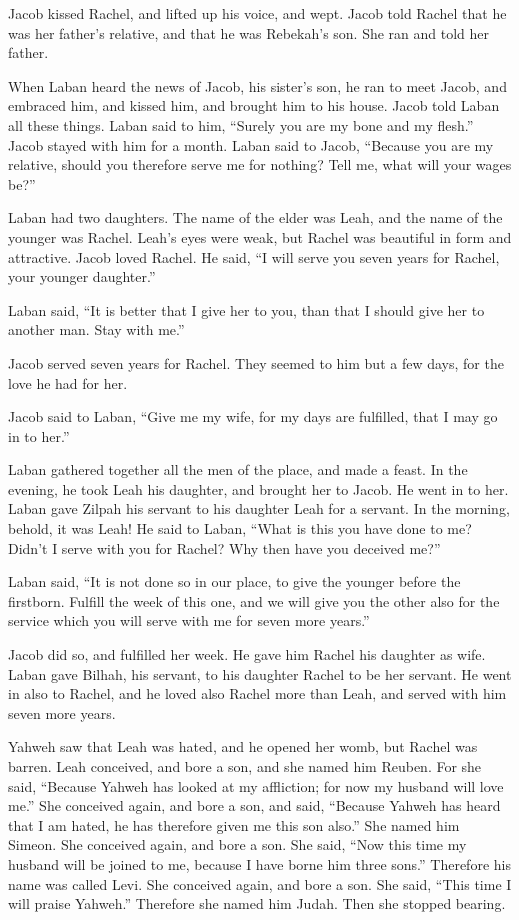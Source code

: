 {Jacob kissed Rachel, and lifted up his voice, and wept.
Jacob told Rachel that he was her father’s relative, and that he was Rebekah’s son. She ran and told her father.
\par }{\PP {}When Laban heard the news of Jacob, his sister’s son, he ran to meet Jacob, and embraced him, and kissed him, and brought him to his house. Jacob told Laban all these things.
Laban said to him, “Surely you are my bone and my flesh.” Jacob stayed with him for a month.
Laban said to Jacob, “Because you are my relative, should you therefore serve me for nothing? Tell me, what will your wages be?”
\par }{\PP {}Laban had two daughters. The name of the elder was Leah, and the name of the younger was Rachel.
Leah’s eyes were weak, but Rachel was beautiful in form and attractive.
Jacob loved Rachel. He said, “I will serve you seven years for Rachel, your younger daughter.”
\par }{\PP {}Laban said, “It is better that I give her to you, than that I should give her to another man. Stay with me.”
\par }{\PP {}Jacob served seven years for Rachel. They seemed to him but a few days, for the love he had for her.
\par }{\PP {}Jacob said to Laban, “Give me my wife, for my days are fulfilled, that I may go in to her.”
\par }{\PP {}Laban gathered together all the men of the place, and made a feast.
In the evening, he took Leah his daughter, and brought her to Jacob. He went in to her.
Laban gave Zilpah his servant to his daughter Leah for a servant.
In the morning, behold, it was Leah! He said to Laban, “What is this you have done to me? Didn’t I serve with you for Rachel? Why then have you deceived me?”
\par }{\PP {}Laban said, “It is not done so in our place, to give the younger before the firstborn.
Fulfill the week of this one, and we will give you the other also for the service which you will serve with me for seven more years.”
\par }{\PP {}Jacob did so, and fulfilled her week. He gave him Rachel his daughter as wife.
Laban gave Bilhah, his servant, to his daughter Rachel to be her servant.
He went in also to Rachel, and he loved also Rachel more than Leah, and served with him seven more years.
\par }{\PP {}Yahweh saw that Leah was hated, and he opened her womb, but Rachel was barren.
Leah conceived, and bore a son, and she named him Reuben. For she said, “Because Yahweh has looked at my affliction; for now my husband will love me.”
She conceived again, and bore a son, and said, “Because Yahweh has heard that I am hated, he has therefore given me this son also.” She named him Simeon.
She conceived again, and bore a son. She said, “Now this time my husband will be joined to me, because I have borne him three sons.” Therefore his name was called Levi.
She conceived again, and bore a son. She said, “This time I will praise Yahweh.” Therefore she named him Judah. Then she stopped bearing.

}
